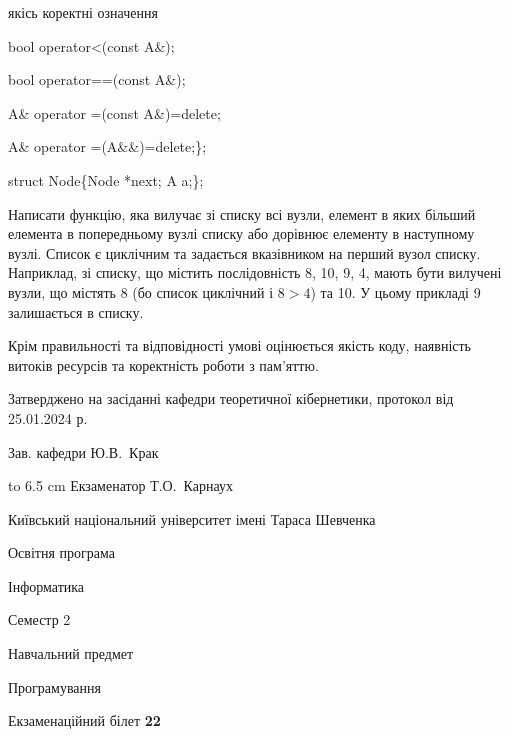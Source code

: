 \documentclass[12pt, ukrainian]{article}
\begin{document}
{\quad  якісь коректні означення 

\quad  bool operator<(const A\&); 

\quad  bool operator==(const A\&); 

\quad A\& operator =(const A\&)=delete; 

\quad  A\& operator =(A\&\&)=delete;\};

struct Node\{Node *next; A a;\};

 Написати функцію, яка вилучає зі списку всі вузли, елемент в яких більший елемента в попередньому вузлі списку або дорівнює елементу в наступному вузлі. Список є циклічним та задається вказівником на перший вузол списку. Наприклад, зі списку, що містить послідовність 8, 10, 9, 4, мають бути вилучені вузли, що містять 8 (бо список циклічний і $8>4$) та 10. У цьому прикладі 9 залишається в списку.

Крім правильності та відповідності умові оцінюється якість коду, наявність витоків ресурсів та коректність роботи з пам'яттю. 

}
{\smallskip\smallskip \begin {scriptsize} Затверджено на засіданні кафедри теоретичної кібернетики, протокол   від   25.01.2024 р.\par\smallskip\smallskip\smallskip\smallskip
{\parbox {6.5 cm} {Зав. кафедри \dotfill Ю.В.~Крак}}\hspace {0.7cm} {\hbox to 6.5 cm { Екзаменатор \dotfill Т.О.~Карнаух}} \end{scriptsize}}
\newpage
{{\begin {scriptsize}\par
{ \center  Київський національний університет імені Тараса Шевченка \par}
{\parbox {5 cm}{Освітня програма \hfill}{\parbox {7 cm}{Інформатика\hfill}}\parbox {6 cm}{\hfill Семестр 2}}\par
{\parbox {5 cm} {Навчальний предмет \hfill}\parbox {7 cm}{Програмування \hfill}\parbox {6cm}{\hfill}\par}\vspace{-15pt} \end{scriptsize}}{\center Екзаменаційний білет \No \textbf { 22 }\par}}
\end{document}
